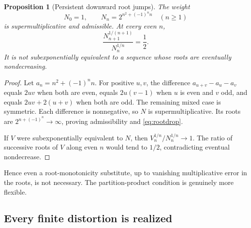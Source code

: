 \documentclass[11pt,a4paper]{article}
\numberwithin{equation}{section}
\newtheorem{proposition}[theorem]{Proposition}
\theoremstyle{definition}
\theoremstyle{remark}
\begin{document}
\begin{proposition}[Persistent downward root jumps]
\label{prop:alternating}
The weight
\begin{equation}
 N_0=1,\qquad N_n=2^{n^2+(-1)^n n}\quad(n\ge1)
 \label{eq:alternating}
\end{equation}
is supermultiplicative and admissible. At every even $n$,
\begin{equation}
 \frac{N_{n+1}^{1/(n+1)}}{N_n^{1/n}}=\frac12.
 \label{eq:rootdrop}
\end{equation}
It is not subexponentially equivalent to a sequence whose roots are
eventually nondecreasing.
\end{proposition}
\begin{proof}
Let $a_n=n^2+(-1)^n n$. For positive $u,v$, the difference
$a_{u+v}-a_u-a_v$ equals $2uv$ when both are even, equals
$2u(v-1)$ when $u$ is even and $v$ odd, and equals $2uv+2(u+v)$
when both are odd. The remaining mixed case is symmetric. Each difference
is nonnegative, so $N$ is supermultiplicative. Its roots are
$2^{n+(-1)^n}\to\infty$, proving admissibility and
\eqref{eq:rootdrop}.

If $V$ were subexponentially equivalent to $N$, then
$V_n^{1/n}/N_n^{1/n}\to1$. The ratio of successive roots of $V$
along even $n$ would tend to $1/2$, contradicting eventual
nondecrease.
\end{proof}

Hence even a root-monotonicity substitute, up to vanishing multiplicative
error in the roots, is not necessary. The partition-product condition
is genuinely more flexible.

\subsection{Every finite distortion is realized}
\end{document}
